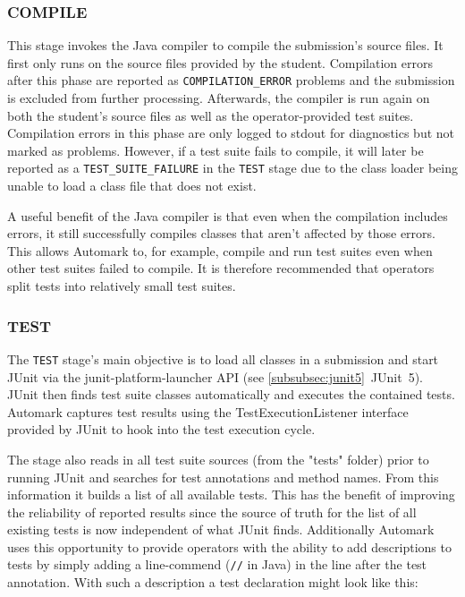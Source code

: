 \documentclass[12pt,a4paper,oneside]{report}
\begin{document}
	\subsubsection{COMPILE}
	This stage invokes the Java compiler to compile the submission's source files. It first only runs on the source files provided by the student. Compilation errors after this phase are reported as \lstinline|COMPILATION_ERROR| problems and the submission is excluded from further processing. Afterwards, the compiler is run again on both the student's source files as well as the operator-provided test suites. Compilation errors in this phase are only logged to stdout for diagnostics but not marked as problems. However, if a test suite fails to compile, it will later be reported as a \lstinline|TEST_SUITE_FAILURE| in the \lstinline|TEST| stage due to the class loader being unable to load a class file that does not exist.

	A useful benefit of the Java compiler is that even when the compilation includes errors, it still successfully compiles classes that aren't affected by those errors. This allows Automark to, for example, compile and run test suites even when other test suites failed to compile. It is therefore recommended that operators split tests into relatively small test suites.

	\subsubsection{TEST}
	The \lstinline|TEST| stage's main objective is to load all classes in a submission and start JUnit via the junit-platform-launcher API (see \ref{subsubsec:junit5}~JUnit~5). JUnit then finds test suite classes automatically and executes the contained tests. Automark captures test results using the TestExecutionListener interface provided by JUnit to hook into the test execution cycle.

	The stage also reads in all test suite sources (from the "tests" folder) prior to running JUnit and searches for test annotations and method names. From this information it builds a list of all available tests. This has the benefit of improving the reliability of reported results since the source of truth for the list of all existing tests is now independent of what JUnit finds. Additionally Automark uses this opportunity to provide operators with the ability to add descriptions to tests by simply adding a line-commend (\lstinline|//| in Java) in the line after the test annotation. With such a description a test declaration might look like this:
\end{document}
